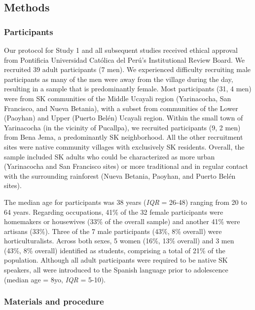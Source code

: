 \documentclass[
  english,
  ,man,floatsintext]{apa6}
\begin{document}
\hypertarget{methods}{%
\subsection{Methods}\label{methods}}

\hypertarget{participants}{%
\subsubsection{Participants}\label{participants}}

Our protocol for Study 1 and all subsequent studies received ethical approval from Pontificia Universidad Católica del Perú's Institutional Review Board. We recruited 39 adult participants (7 men). We experienced difficulty recruiting male participants as many of the men were away from the village during the day, resulting in a sample that is predominantly female. Most participants (31, 4 men) were from SK communities of the Middle Ucayali region (Yarinacocha, San Francisco, and Nueva Betania), with a subset from communities of the Lower (Paoyhan) and Upper (Puerto Belén) Ucayali region. Within the small town of Yarinacocha (in the vicinity of Pucallpa), we recruited participants (9, 2 men) from Bena Jema, a predominantly SK neighborhood. All the other recruitment sites were native community villages with exclusively SK residents. Overall, the sample included SK adults who could be characterized as more urban (Yarinacocha and San Francisco sites) or more traditional and in regular contact with the surrounding rainforest (Nueva Betania, Paoyhan, and Puerto Belén sites).

The median age for participants was 38 years (\emph{IQR} = 26-48) ranging from 20 to 64 years. Regarding occupations, 41\% of the 32 female participants were homemakers or housewives (33\% of the overall sample) and another 41\% were artisans (33\%). Three of the 7 male participants (43\%, 8\% overall) were horticulturalists. Across both sexes, 5 women (16\%, 13\% overall) and 3 men (43\%, 8\% overall) identified as students, comprising a total of 21\% of the population. Although all adult participants were required to be native SK speakers, all were introduced to the Spanish language prior to adolescence (median age = 8yo, \emph{IQR} = 5-10).

\hypertarget{materials-and-procedure}{%
\subsubsection{Materials and procedure}\label{materials-and-procedure}}
\end{document}

